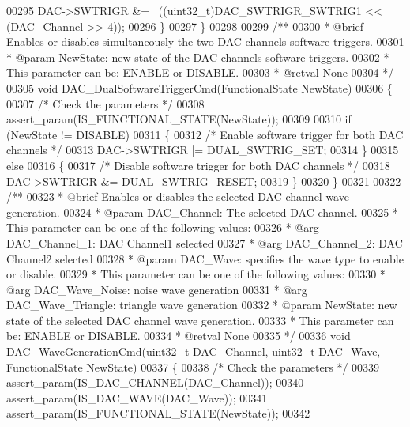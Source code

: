 \begin{DoxyCode}
00295     DAC->SWTRIGR &= ~((uint32\_t)DAC_SWTRIGR_SWTRIG1 << (DAC\_Channel >> 4));
00296   \}
00297 \}
00298 
00299 \textcolor{comment}{/**}
00300 \textcolor{comment}{  * @brief  Enables or disables simultaneously the two DAC channels software triggers.}
00301 \textcolor{comment}{  * @param  NewState: new state of the DAC channels software triggers.}
00302 \textcolor{comment}{  *          This parameter can be: ENABLE or DISABLE.}
00303 \textcolor{comment}{  * @retval None}
00304 \textcolor{comment}{  */}
00305 \textcolor{keywordtype}{void} DAC_DualSoftwareTriggerCmd(FunctionalState NewState)
00306 \{
00307   \textcolor{comment}{/* Check the parameters */}
00308   assert_param(IS\_FUNCTIONAL\_STATE(NewState));
00309 
00310   \textcolor{keywordflow}{if} (NewState != DISABLE)
00311   \{
00312     \textcolor{comment}{/* Enable software trigger for both DAC channels */}
00313     DAC->SWTRIGR |= DUAL_SWTRIG_SET;
00314   \}
00315   \textcolor{keywordflow}{else}
00316   \{
00317     \textcolor{comment}{/* Disable software trigger for both DAC channels */}
00318     DAC->SWTRIGR &= DUAL_SWTRIG_RESET;
00319   \}
00320 \}
00321 
00322 \textcolor{comment}{/**}
00323 \textcolor{comment}{  * @brief  Enables or disables the selected DAC channel wave generation.}
00324 \textcolor{comment}{  * @param  DAC\_Channel: The selected DAC channel. }
00325 \textcolor{comment}{  *          This parameter can be one of the following values:}
00326 \textcolor{comment}{  *            @arg DAC\_Channel\_1: DAC Channel1 selected}
00327 \textcolor{comment}{  *            @arg DAC\_Channel\_2: DAC Channel2 selected}
00328 \textcolor{comment}{  * @param  DAC\_Wave: specifies the wave type to enable or disable.}
00329 \textcolor{comment}{  *          This parameter can be one of the following values:}
00330 \textcolor{comment}{  *            @arg DAC\_Wave\_Noise: noise wave generation}
00331 \textcolor{comment}{  *            @arg DAC\_Wave\_Triangle: triangle wave generation}
00332 \textcolor{comment}{  * @param  NewState: new state of the selected DAC channel wave generation.}
00333 \textcolor{comment}{  *          This parameter can be: ENABLE or DISABLE.  }
00334 \textcolor{comment}{  * @retval None}
00335 \textcolor{comment}{  */}
00336 \textcolor{keywordtype}{void} DAC_WaveGenerationCmd(uint32\_t DAC\_Channel, uint32\_t DAC\_Wave, FunctionalState NewState)
00337 \{
00338   \textcolor{comment}{/* Check the parameters */}
00339   assert_param(IS\_DAC\_CHANNEL(DAC\_Channel));
00340   assert_param(IS\_DAC\_WAVE(DAC\_Wave));
00341   assert_param(IS\_FUNCTIONAL\_STATE(NewState));
00342 

\end{DoxyCode}
